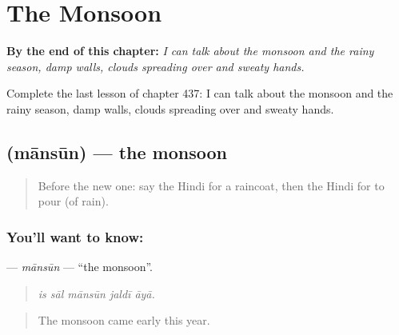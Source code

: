 
\chapter{The Monsoon}
\label{ch:hi-the-monsoon}

\begin{chapteropening}
\textbf{By the end of this chapter:} \emph{I can talk about the monsoon and the rainy season, damp walls, clouds spreading over and sweaty hands.}

Complete the last lesson of chapter 437: I can talk about the monsoon and the rainy season, damp walls, clouds spreading over and sweaty hands.
\end{chapteropening}

\section[\texorpdfstring{\hi{मानसून} (mānsūn)}{मानसून (mānsūn)}]{ (mānsūn) — the monsoon}

\label{lesson:HI-C437-mansun}



\begin{quote}
Before the new one: say the Hindi for a raincoat, then the Hindi for to pour (of rain).
\end{quote}

\subsection*{You'll want to know: }
\textbf{} — \emph{mānsūn} — \textquotedblleft{}the monsoon\textquotedblright{}.

\begin{quote}
    
\end{quote}

\begin{quote}
\emph{is sāl mānsūn jaldī āyā.}
\end{quote}

\begin{quote}
The monsoon came early this year.
\end{quote}

